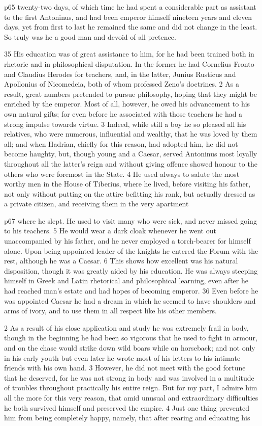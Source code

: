 p65 twenty-two days, of which time he had spent a considerable part as assistant to the first Antoninus, and had been emperor himself nineteen years and eleven days, yet from first to last he remained the same and did not change in the least. So truly was he a good man and devoid of all pretence.

35
His education was of great assistance to him, for he had been trained both in rhetoric and in philosophical disputation. In the former he had Cornelius Fronto and Claudius Herodes for teachers, and, in the latter, Junius Rusticus and Apollonius of Nicomedeia,\texthebrew{⁠} both of whom professed Zeno's doctrines. 2 As a result, great numbers pretended to pursue philosophy, hoping that they might be enriched by the emperor. Most of all, however, he owed his advancement to his own natural gifts; for even before he associated with those teachers he had a strong impulse towards virtue. 3 Indeed, while still a boy he so pleased all his relatives, who were numerous, influential and wealthy, that he was loved by them all; and when Hadrian, chiefly for this reason, had adopted him, he did not become haughty, but, though young and a Caesar, served Antoninus most loyally throughout all the latter's reign and without giving offence showed honour to the others who were foremost in the State. 4 He used always to salute the most worthy men in the House of Tiberius, where he lived, before visiting his father, not only without putting on the attire befitting his rank, but actually dressed as a private citizen, and receiving them in the very apartment

p67 where he slept. He used to visit many who were sick, and never missed going to his teachers. 5 He would wear a dark cloak whenever he went out unaccompanied by his father, and he never employed a torch-bearer for himself alone. Upon being appointed leader of the knights he entered the Forum with the rest, although he was a Caesar. 6 This shows how excellent was his natural disposition, though it was greatly aided by his education. He was always steeping himself in Greek and Latin rhetorical and philosophical learning, even after he had reached man's estate and had hopes of becoming emperor. 36 Even before he was appointed Caesar he had a dream in which he seemed to have shoulders and arms of ivory, and to use them in all respect like his other members.

2 As a result of his close application and study he was extremely frail in body, though in the beginning he had been so vigorous that he used to fight in armour, and on the chase would strike down wild boars while on horseback; and not only in his early youth but even later he wrote most of his letters to his intimate friends with his own hand. 3 However, he did not meet with the good fortune that he deserved, for he was not strong in body and was involved in a multitude of troubles throughout practically his entire reign. But for my part, I admire him all the more for this very reason, that amid unusual and extraordinary difficulties he both survived himself and preserved the empire. 4 Just one thing prevented him from being completely happy, namely, that after rearing and educating his

